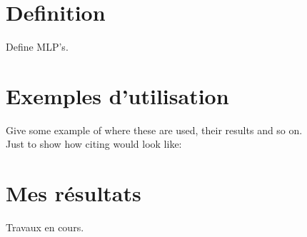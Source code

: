 \section{Definition}
Define MLP's.\\

\section{Exemples d'utilisation}
Give some example of where these are used, their results and so on.\\
Just to show how citing would look like: \cite{cnn_begginer_guide}

\section{Mes résultats}
Travaux en cours.\\